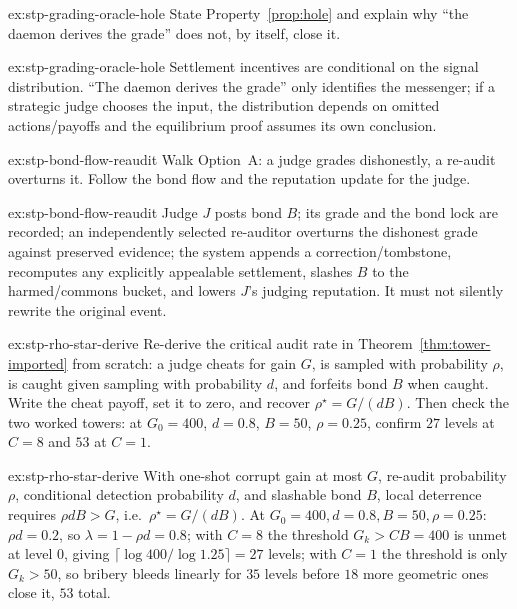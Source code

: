 \documentclass[11pt,a4paper]{article}
\theoremstyle{definition}
\begin{document}
\begin{pdexercise}[kind=Check,rating=1]{ex:stp-grading-oracle-hole}
State Property~\ref{prop:hole} and explain why ``the daemon derives the
grade'' does not, by itself, close it.
\end{pdexercise}
\begin{pdsolution}{ex:stp-grading-oracle-hole}
Settlement incentives are conditional on the signal distribution. ``The
daemon derives the grade'' only identifies the messenger; if a strategic
judge chooses the input, the distribution depends on omitted actions/payoffs
and the equilibrium proof assumes its own conclusion.
\end{pdsolution}
\begin{pdexercise}[kind=Trace,rating=2]{ex:stp-bond-flow-reaudit}
Walk Option~A: a judge grades dishonestly, a re-audit overturns it. Follow
the bond flow and the reputation update for the judge.
\end{pdexercise}
\begin{pdsolution}{ex:stp-bond-flow-reaudit}
Judge $J$ posts bond $B$; its grade and the bond lock are recorded; an
independently selected re-auditor overturns the dishonest grade against
preserved evidence; the system appends a correction/tombstone, recomputes any
explicitly appealable settlement, slashes $B$ to the harmed/commons bucket,
and lowers $J$'s judging reputation. It must not silently rewrite the
original event.
\end{pdsolution}
\begin{pdexercise}[kind=Trace,rating=2]{ex:stp-rho-star-derive}
Re-derive the critical audit rate in Theorem~\ref{thm:tower-imported} from
scratch: a judge cheats for gain $G$, is sampled with probability $\rho$, is
caught given sampling with probability $d$, and forfeits bond $B$ when
caught. Write the cheat payoff, set it to zero, and recover
$\rho^\star = G/(dB)$. Then check the two worked towers: at $G_0=400$,
$d=0.8$, $B=50$, $\rho=0.25$, confirm $27$ levels at $C=8$ and $53$ at $C=1$.
\end{pdexercise}
\begin{pdsolution}{ex:stp-rho-star-derive}
With one-shot corrupt gain at most $G$, re-audit probability $\rho$,
conditional detection probability $d$, and slashable bond $B$, local
deterrence requires $\rho d B > G$, i.e.\ $\rho^\star=G/(dB)$. At
$G_0=400,d=0.8,B=50,\rho=0.25$: $\rho d=0.2$, so $\lambda=1-\rho d=0.8$; with
$C=8$ the threshold $G_k>CB=400$ is unmet at level $0$, giving
$\lceil\log 400/\log 1.25\rceil=27$ levels; with $C=1$ the threshold is only
$G_k>50$, so bribery bleeds linearly for $35$ levels before $18$ more
geometric ones close it, $53$ total.
\end{pdsolution}
\end{document}
